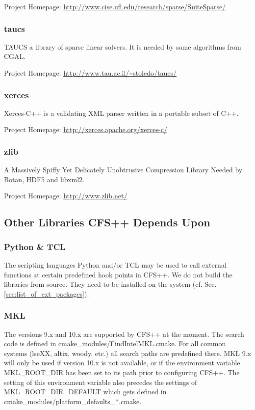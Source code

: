 \noindent Project Homepage: \url{http://www.cise.ufl.edu/research/sparse/SuiteSparse/}

\subsubsection{taucs}  
TAUCS a library of sparse linear solvers. It is needed by some algorithms from
CGAL.

\noindent Project Homepage: \url{http://www.tau.ac.il/~stoledo/taucs/}

\subsubsection{xerces}  Xerces-C++ is  a validating  XML parser  written  in a
portable subset of C++.

\noindent Project Homepage: \url{http://xerces.apache.org/xerces-c/}

\subsubsection{zlib} A Massively Spiffy Yet Delicately Unobtrusive Compression
Library Needed by Botan, HDF5 and libxml2.

\noindent Project Homepage: \url{http://www.zlib.net/}

\subsection{Other Libraries CFS++ Depends Upon}
\subsubsection{Python \& TCL}

The  scripting  languages Python  and/or  TCL may  be  used  to call  external
functions at  certain predefined  hook points  in CFS++. We  do not  build the
libraries   from  source.   They  need   to   be  installed   on  the   system
(cf. Sec. \ref{sec:list_of_ext_packages}).

\subsubsection{MKL}

The versions  9.x and 10.x are supported  by CFS++ at the  moment.  The search
code is  defined in cmake\_modules/FindIntelMKL.cmake. For  all common systems
(lseXX, altix, woody,  etc.)  all search paths are  predefined there.  MKL 9.x
will only  be used  if version 10.x  is not  available, or if  the environment
variable  MKL\_ROOT\_DIR  has  been  set  to its  path  prior  to  configuring
CFS++. The setting of this  environment variable also precedes the settings of
MKL\_ROOT\_DIR\_DEFAULT         which          gets         defined         in
cmake\_modules/platform\_defaults\_*.cmake.

